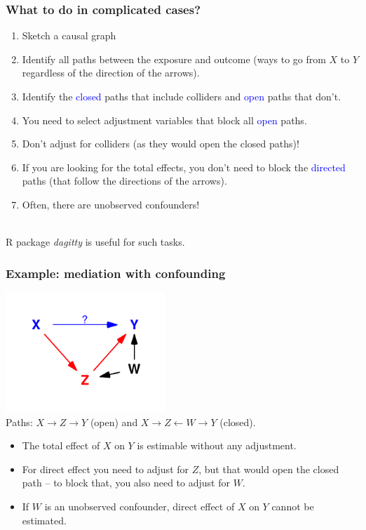 \documentclass[10pt,dvipsnames,t,handout%
,aspectratio=169%
]{beamer}%
\newcommand{\sini}[1]{\textcolor{Blue}{#1}}
\begin{document}
\begin{frame}
\frametitle{What to do in complicated cases?}

\begin{enumerate}
\item Sketch a causal graph
\item Identify all paths between the exposure and outcome (ways to go from $X$ to $Y$ regardless of the direction of the arrows).
\item Identify the \sini{closed} paths that include colliders and \sini{open} paths that don't.  
\item You need to select adjustment variables that block all \sini{open} paths.
\item \alert{Don't} adjust for colliders (as they would open the closed paths)!
 \item If you are looking for the total effects, you don't need to block the \sini{directed} paths (that follow the directions of the arrows). 
\item \alert{Often, there are unobserved confounders!} 
\end{enumerate}
\mbox{}\\[0.5cm]
R package \textit{dagitty} is useful for such tasks.
\end{frame}


\begin{frame}
\frametitle{Example: mediation with confounding}
\includegraphics[width=6cm]{mediation_conf}\\[-0.3cm]
Paths:
$X \rightarrow Z \rightarrow Y$ (open) and $X \rightarrow Z \leftarrow W \rightarrow Y$ (closed). \\[0.3cm]
\begin{itemize}
	\item The total effect of $X$ on $Y$ is estimable without any adjustment.
	\item For direct effect you need to adjust for $Z$, but that would open the closed path -- to block that, you also need to adjust for $W$. 
	\item If $W$ is an unobserved confounder, direct effect of $X$ on $Y$ cannot be estimated. 
\end{itemize} 
 
\end{frame}
\end{document}
